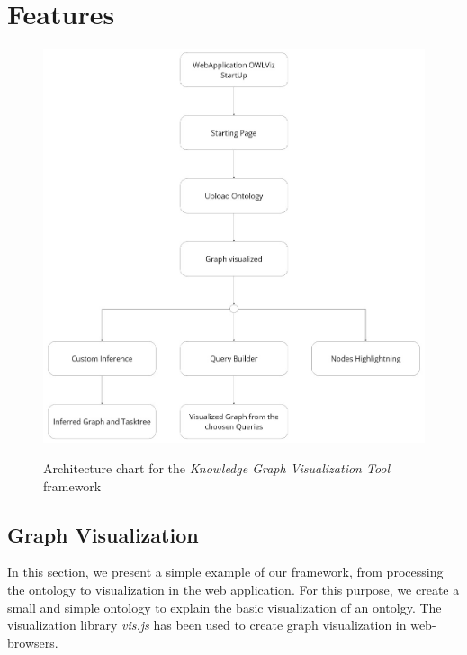 \section{Features}

\begin{figure}[H]
    \centering
    \includegraphics[scale=0.35]{Graphics/architecture_simplified.jpg}
    \label{fig:OWLViz_architecture}
    \caption{Architecture chart for the \textit{Knowledge Graph Visualization Tool} framework}
\end{figure}

\subsection{Graph Visualization}
In this section, we present a simple example of our framework, from processing the ontology to visualization in the web application. 
For this purpose, we create a small and simple ontology to explain the basic visualization of an ontolgy. 
The visualization library \textit{vis.js} \cite{visjs} has been used to create graph visualization in web-browsers.

